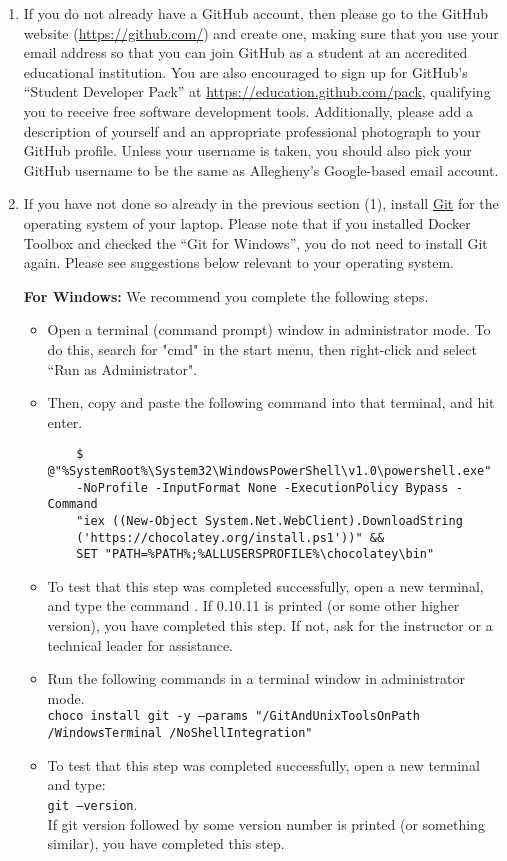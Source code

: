 \begin{enumerate}

  \item If you do not already have a GitHub account, then please go to the GitHub website (\url{https://github.com/}) and create one, making sure
    that you use your  email address so that you can join GitHub as a student at an accredited
    educational institution. You are also encouraged to sign up for GitHub's ``Student Developer Pack'' at
    \url{https://education.github.com/pack}, qualifying you to receive free software development tools. Additionally,
    please add a description of yourself and an appropriate professional photograph to your GitHub profile. Unless your
    username is taken, you should also pick your GitHub username to be the same as Allegheny's Google-based email
    account. 
  
  \item If you have not done so already in the previous section (1), install \href{https://git-scm.com/downloads}{Git} for the operating system of your laptop. Please note that if you installed Docker Toolbox and checked the ``Git for Windows'', you do not need to install Git again. Please see suggestions below relevant to your operating system.
  
  \textbf{For Windows:} 
   We recommend you complete the following steps.
  \begin{itemize}
  	\item Open a terminal (command prompt) window in administrator mode. To do this, search for "cmd" in the start menu, then right-click and select ``Run as Administrator". 
  	\item Then, copy and paste the following command into that terminal, and hit enter.   
  	\begin{verbatim}
  	$ @"%SystemRoot%\System32\WindowsPowerShell\v1.0\powershell.exe" 
  	-NoProfile -InputFormat None -ExecutionPolicy Bypass -Command 
  	"iex ((New-Object System.Net.WebClient).DownloadString
  	('https://chocolatey.org/install.ps1'))" && 
  	SET "PATH=%PATH%;%ALLUSERSPROFILE%\chocolatey\bin"
  	\end{verbatim}
	\item To test that this step was completed successfully, open a new terminal, and type the command . If 0.10.11 is printed (or some other higher version), you have completed this step. If not, ask for the instructor or a technical leader for assistance.
	\item Run the following commands in a terminal window in administrator mode. \\
	{\tt choco install git -y --params "/GitAndUnixToolsOnPath} \\
	{\tt /WindowsTerminal /NoShellIntegration"}
	\item To test that this step was completed successfully, open a new terminal and type: \\ {\tt git --version}. \\
	If git version followed by some version number is printed (or something similar), you have completed this step.
	\end{itemize}
	

\end{enumerate}
